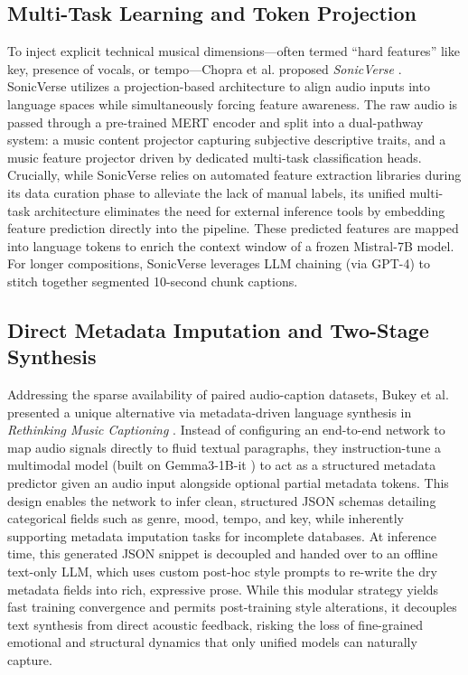 \documentclass[12pt, conference, letterpaper]{IEEEtran}
\begin{document}
\subsection{Multi-Task Learning and Token Projection}
To inject explicit technical musical dimensions---often termed ``hard features'' like key, presence of vocals, or tempo---Chopra et al. proposed \textit{SonicVerse} \cite{chopra2025sonicverse}. SonicVerse utilizes a projection-based architecture to align audio inputs into language spaces while simultaneously forcing feature awareness. The raw audio is passed through a pre-trained MERT encoder \cite{mert} and split into a dual-pathway system: a music content projector capturing subjective descriptive traits, and a music feature projector driven by dedicated multi-task classification heads. Crucially, while SonicVerse relies on automated feature extraction libraries during its data curation phase to alleviate the lack of manual labels, its unified multi-task architecture eliminates the need for external inference tools by embedding feature prediction directly into the pipeline. These predicted features are mapped into language tokens to enrich the context window of a frozen Mistral-7B model. For longer compositions, SonicVerse leverages LLM chaining (via GPT-4) to stitch together segmented 10-second chunk captions.

\subsection{Direct Metadata Imputation and Two-Stage Synthesis}
Addressing the sparse availability of paired audio-caption datasets, Bukey et al. presented a unique alternative via metadata-driven language synthesis in \textit{Rethinking Music Captioning} \cite{bukey2026rethinking}. Instead of configuring an end-to-end network to map audio signals directly to fluid textual paragraphs, they instruction-tune a multimodal model (built on Gemma3-1B-it \cite{gemma3}) to act as a structured metadata predictor given an audio input alongside optional partial metadata tokens. This design enables the network to infer clean, structured JSON schemas detailing categorical fields such as genre, mood, tempo, and key, while inherently supporting metadata imputation tasks for incomplete databases. At inference time, this generated JSON snippet is decoupled and handed over to an offline text-only LLM, which uses custom post-hoc style prompts to re-write the dry metadata fields into rich, expressive prose. While this modular strategy yields fast training convergence and permits post-training style alterations, it decouples text synthesis from direct acoustic feedback, risking the loss of fine-grained emotional and structural dynamics that only unified models can naturally capture.
\end{document}
